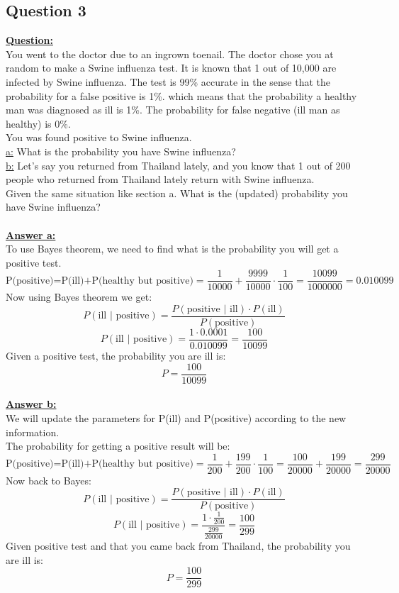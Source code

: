 \documentclass[a4, 12pt,titlepage]{scrartcl}
\begin{document}
\subsection{Question 3}
\textbf{\underline{Question:}}\\
You went to the doctor due to an ingrown toenail. The doctor chose you at random to make a Swine influenza test. It is known that 1 out of 10,000 are infected by Swine influenza. The test is 99\% accurate in the sense that the probability for a false positive is 1\%. which means that the probability a healthy man was diagnosed as ill is 1\%. The probability for false negative (ill man as healthy) is 0\%.\\
You was found positive to Swine influenza.\\

\noindent
\underline{a:} What is the probability you have Swine influenza?\\
\underline{b:} Let's say you returned from Thailand lately, and you know that 1 out of 200 people who returned from Thailand lately return with Swine influenza.\\
Given the same situation like section a. What is the (updated) probability you have Swine influenza? \\
\smallskip\\

\noindent
\textbf{\underline{Answer a:}}\\
To use Bayes theorem, we need to find what is the probability you will get a positive test. \[
\textrm{P(positive)=P(ill)+P(healthy but positive)}=\frac{1}{10000}+\frac{9999}{10000}\cdot \frac{1}{100}=\frac{10099}{1000000}=0.010099
\]
Now using Bayes theorem we get:\[
P(\textrm{ill $|$ positive})=\frac{P(\textrm{positive $|$ ill})\cdot P(\textrm{ill})}{P(\textrm{positive})}
\]
\[
P(\textrm{ill $|$ positive})=\frac{1\cdot 0.0001}{0.010099}=\frac{100}{10099}
\]
Given a positive test, the probability you are ill is:\[
\boxed{P=\frac{100}{10099}}
\]
\smallskip\\
\textbf{\underline{Answer b:}}\\
We will update the parameters for P(ill) and P(positive) according to the new information.\\
The probability for getting a positive result will be:\[
\textrm{P(positive)=P(ill)+P(healthy but positive)}=\frac{1}{200}+\frac{199}{200}\cdot \frac{1}{100}=\frac{100}{20000}+\frac{199}{20000}=\frac{299}{20000}
\]
Now back to Bayes:\[
P(\textrm{ill $|$ positive})=\frac{P(\textrm{positive $|$ ill})\cdot P(\textrm{ill})}{P(\textrm{positive})}
\]
\[
P(\textrm{ill $|$ positive})=\frac{1\cdot \frac{1}{200}}{\frac{299}{20000}}=\frac{100}{299}
\]Given positive test and that you came back from Thailand, the probability you are ill is:\[
\boxed{P=\frac{100}{299}}
\]
\newpage
\end{document}
